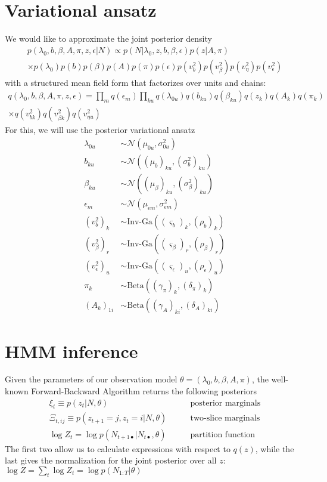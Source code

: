\documentclass[11pt]{article}
\begin{document}
\section{Variational ansatz}
We would like to approximate the joint posterior density
\begin{multline}
    p(\lambda_0, b, \beta, A, \pi, z, \epsilon|N) \propto p(N|\lambda_0, z, b, \beta, \epsilon) p(z|A, \pi) \\
    \times p(\lambda_0) p(b) p(\beta) p(A) p(\pi) p(\epsilon) p(v^2_b) p(v^2_\beta) p(v^2_\eta) p(v^2_\epsilon)
\end{multline}
with a structured mean field form that factorizes over units and chains:
\begin{multline}
    q(\lambda_0, b, \beta, A, \pi, z, \epsilon) = \prod_m q(\epsilon_m) \prod_{ku} q(\lambda_{0u})
    q(b_{ku}) q(\beta_{ku}) q(z_k) q(A_k) q(\pi_k) \\
    \times q(v^2_{bk}) q(v^2_{\beta k}) q(v^2_{\eta u})
\end{multline}
For this, we will use the posterior variational ansatz
\begin{align}
    \lambda_{0u} &\sim \mathcal{N}\left(\mu_{0u}, \sigma^2_{0u}\right) \\
    b_{ku} &\sim \mathcal{N}\left((\mu_b)_{ku}, (\sigma^2_b)_{ku}\right) \\
    \beta_{ku} &\sim \mathcal{N}\left((\mu_\beta)_{ku}, (\sigma^2_\beta)_{ku}\right) \\
    \epsilon_m &\sim \mathcal{N}\left(\mu_{\epsilon m}, \sigma^2_{\epsilon m}\right) \\
    (v^2_b)_{k} &\sim \text{Inv-Ga}\left((\varsigma_b)_{k}, (\rho_b)_{k} \right) \\
    (v^2_\beta)_{r} &\sim \text{Inv-Ga}\left((\varsigma_\beta)_r, (\rho_\beta)_r \right) \\
    (v^2_\epsilon)_{u} &\sim \text{Inv-Ga}\left((\varsigma_\epsilon)_u, (\rho_\epsilon)_u \right) \\
    \pi_k &\sim \mathrm{Beta}\left((\gamma_\pi)_k, (\delta_\pi)_k \right) \\
    \left(A_k \right)_{1i} &\sim \mathrm{Beta}\left((\gamma_A)_{ki}, (\delta_A)_{ki} \right)
\end{align}

\section{HMM inference}
Given the parameters of our observation model $\theta = (\lambda_0, b, \beta, A, \pi)$, the well-known Forward-Backward Algorithm returns the following posteriors
\begin{align}
    \xi_t \equiv p(z_t|N, \theta) &\qquad \text{posterior marginals} \\
    \Xi_{t, ij} \equiv p(z_{t+1} = j, z_t = i|N, \theta) &\qquad \text{two-slice marginals} \\
    \log Z_t = \log p(N_{t+1 \bullet}|N_{t\bullet}, \theta) &\qquad \text{partition function}
\end{align}
The first two allow us to calculate expressions with respect to $q(z)$, while the last gives the normalization for the joint posterior over all $z$: $\log Z = \sum_t \log Z_t = \log p(N_{1:T}|\theta)$
\end{document}
